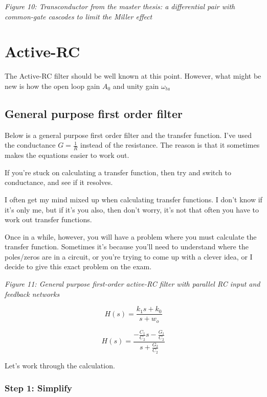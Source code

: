 {
\centering
{}
}

\emph{Figure 10: Transconductor from the master thesis: a differential
pair with common-gate cascodes to limit the Miller effect}

\section{Active-RC}\label{active-rc}

The Active-RC filter should be well known at this point. However, what
might be new is how the open loop gain \(A_0\) and unity gain
\(\omega_{ta}\)

\subsection{General purpose first order
filter}\label{general-purpose-first-order-filter}

Below is a general purpose first order filter and the transfer function.
I've used the conductance \(G = \frac{1}{R}\) instead of the resistance.
The reason is that it sometimes makes the equations easier to work out.

If you're stuck on calculating a transfer function, then try and switch
to conductance, and see if it resolves.

I often get my mind mixed up when calculating transfer functions. I
don't know if it's only me, but if it's you also, then don't worry, it's
not that often you have to work out transfer functions.

Once in a while, however, you will have a problem where you must
calculate the transfer function. Sometimes it's because you'll need to
understand where the poles/zeros are in a circuit, or you're trying to
come up with a clever idea, or I decide to give this exact problem on
the exam.


{
\centering
{}
}

\emph{Figure 11: General purpose first-order active-RC filter with
parallel RC input and feedback networks}

\[ H(s) = \frac{ k_1 s + k_0 }{s + w_o}\]

\[ H(s) = \frac{  -\frac{C_1}{C_2}s -\frac{G_1}{ C_2}}{s + \frac{G_2}{ C_2}}\]

Let's work through the calculation.

\subsubsection{Step 1: Simplify}\label{step-1-simplify}

